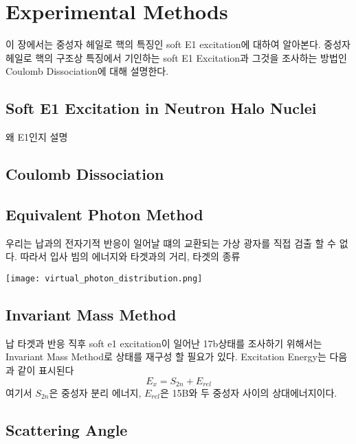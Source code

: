 \chapter{Experimental Methods}
이 장에서는 중성자 헤일로 핵의 특징인 soft E1 excitation에 대하여 알아본다. 중성자 헤일로 핵의 구조상 특징에서 기인하는 soft E1 Excitation과 그것을 조사하는 방법인 Coulomb Dissociation에 대해 설명한다. 
\section{Soft E1 Excitation in Neutron Halo Nuclei}
왜 E1인지 설명
\section{Coulomb Dissociation}

\section{Equivalent Photon Method}
우리는 납과의 전자기적 반응이 일어날 떄의 교환되는 가상 광자를 직접 검출 할 수 없다. 따라서 입사 빔의 에너지와 타겟과의 거리, 타겟의 종류
\begin{center}
\texttt{[image: virtual\_photon\_distribution.png]}    
\end{center}

\section{Invariant Mass Method}
납 타겟과 반응 직후 soft e1 excitation이 일어난 17b상태를 조사하기 위해서는 Invariant Mass Method로 상태를 재구성 할 필요가 있다. Excitation Energy는 다음과 같이 표시된다
\begin{displaymath}
{E}_{x}={S}_{2n}+{E}_{rel}
\end{displaymath}
여기서 ${S}_{2n}$은 중성자 분리 에너지, ${E}_{rel}$은 15B와 두 중성자 사이의 상대에너지이다. 
\section{Scattering Angle}